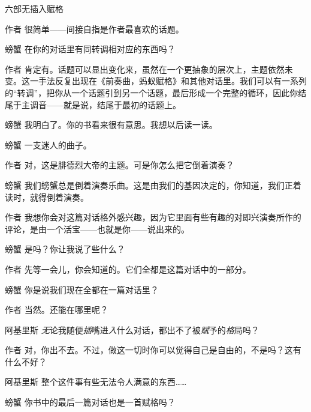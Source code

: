 \begin{dialog}{六部无插入赋格}
\begin{dialogue}
\item[作者]很简单——间接自指是作者最喜欢的话题。

\item[螃蟹]在你的对话里有同转调相对应的东西吗？

\item[作者]肯定有。话题可以显出变化来，虽然在一个更抽象的层次上，主题依然未变。这一手法反复出现在《前奏曲，蚂蚁赋格》和其他对话里。我们可以有一系列的“转调”，把你从一个话题引到另一个话题，最后形成一个完整的循环，因此你结尾于主调音——就是说，结尾于最初的话题上。

\item[螃蟹]我明白了。你的书看来很有意思。我想以后读一读。


\item[螃蟹]一支迷人的曲子。

\item[作者]对，这是腓德烈大帝的主题。可是你怎么把它倒着演奏？

\item[螃蟹]我们螃蟹总是倒着演奏乐曲。这是由我们的基因决定的，你知道，我们正着读时，就得倒着演奏。


\item[作者]我想你会对这篇对话格外感兴趣，因为它里面有些有趣的对即兴演奏所作的评论，是由一个活宝——也就是你——说出来的。

\item[螃蟹]是吗？你让我说了些什么？

\item[作者]先等一会儿，你会知道的。它们全都是这篇对话中的一部分。

\item[螃蟹]你是说我们现在全都在一篇对话里？

\item[作者]当然。还能在哪里呢？

\item[阿基里斯]\emph{无}论我随便\emph{插}嘴进\emph{入}什么对话，都出不了被\emph{赋}予的\emph{格}局吗？

\item[作者]对，你出不去。不过，做这一切时你可以觉得自己是自由的，不是吗？这有什么不好？

\item[阿基里斯]整个这件事有些无法令人满意的东西……

\item[螃蟹]你书中的最后一篇对话也是一首赋格吗？


\end{dialogue}
\end{dialog}
